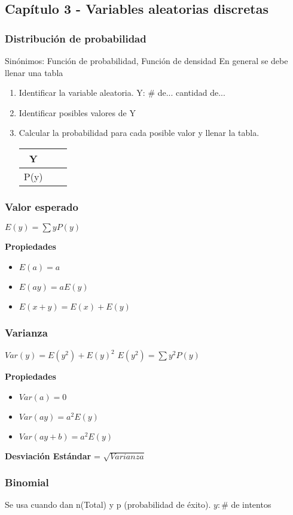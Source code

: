 \subsection{Capítulo 3 - Variables aleatorias discretas}
\subsubsection{Distribución de probabilidad}
Sinónimos: Función de probabilidad, Función de densidad
En general se debe llenar una tabla
\begin{enumerate}
	\item Identificar la variable aleatoria. Y: $\#$ de... cantidad de...
	\item Identificar posibles valores de Y
	\item Calcular la probabilidad para cada posible valor y llenar la tabla.
	
	\begin{tabular}{|c|c|c|}
		Y & &\\
		\hline
		P(y) & &
	\end{tabular}
\end{enumerate}
\subsubsection{Valor esperado}
$E(y)=\sum yP(y)$

\textbf{Propiedades}
\begin{itemize}
	\item $E(a)=a$
	\item $E(ay)=aE(y)$
	\item $E(x+y)=E(x)+E(y)$
\end{itemize}

\subsubsection{Varianza}
$Var(y)=E(y^2)+E(y)^2$
$E(y^2)=\sum y^2P(y)$

\textbf{Propiedades}
\begin{itemize}
	\item $Var(a)=0$
	\item $Var(ay)=a^2E(y)$
	\item $Var(ay+b)=a^2E(y)$
\end{itemize}
\textbf{Desviación Estándar} =  $\sqrt{Varianza}$
\subsubsection{Binomial}
Se usa cuando dan n(Total) y p (probabilidad de éxito). $y:\#$ de intentos

